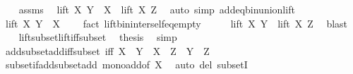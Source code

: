\begin{isabellebody}
\ \ \isamarkupfalse%
\ assms\ \isamarkupfalse%
\ {\isachardoublequoteopen}lift\ X\ Y\ {\isasymsubseteq}\ X\ {\isasymunion}\ lift\ X\ Z{\isachardoublequoteclose}\ \isamarkupfalse%
\ {\isacharparenleft}{\kern0pt}auto\ simp{\isacharcolon}{\kern0pt}\ add{\isacharunderscore}{\kern0pt}eq{\isacharunderscore}{\kern0pt}bin{\isacharunderscore}{\kern0pt}union{\isacharunderscore}{\kern0pt}lift{\isacharparenright}{\kern0pt}\isanewline
\ \ \isamarkupfalse%
\ \isamarkupfalse%
\ {\isachardoublequoteopen}lift\ X\ Y\ {\isasyminter}\ X\ {\isacharequal}{\kern0pt}\ {\isacharbraceleft}{\kern0pt}{\isacharbraceright}{\kern0pt}{\isachardoublequoteclose}\ \isamarkupfalse%
\ {\isacharparenleft}{\kern0pt}fact\ lift{\isacharunderscore}{\kern0pt}bin{\isacharunderscore}{\kern0pt}inter{\isacharunderscore}{\kern0pt}self{\isacharunderscore}{\kern0pt}eq{\isacharunderscore}{\kern0pt}empty{\isacharparenright}{\kern0pt}\isanewline
\ \ \isamarkupfalse%
\ \isamarkupfalse%
\ {\isachardoublequoteopen}lift\ X\ Y\ {\isasymsubseteq}\ lift\ X\ Z{\isachardoublequoteclose}\ \isamarkupfalse%
\ blast\isanewline
\ \ \isamarkupfalse%
\ lift{\isacharunderscore}{\kern0pt}subset{\isacharunderscore}{\kern0pt}lift{\isacharunderscore}{\kern0pt}iff{\isacharunderscore}{\kern0pt}subset\ \isamarkupfalse%
\ {\isacharquery}{\kern0pt}thesis\ \isamarkupfalse%
\ simp\isanewline
{}\isamarkupfalse%
%
\endisatagproof
{\isafoldproof}%
%
\isadelimproof
\isanewline
%
\endisadelimproof
\isanewline
{}\isamarkupfalse%
\ add{\isacharunderscore}{\kern0pt}subset{\isacharunderscore}{\kern0pt}add{\isacharunderscore}{\kern0pt}iff{\isacharunderscore}{\kern0pt}subset\ {\isacharbrackleft}{\kern0pt}iff{\isacharbrackright}{\kern0pt}{\isacharcolon}{\kern0pt}\ {\isachardoublequoteopen}X\ {\isacharplus}{\kern0pt}\ Y\ {\isasymsubseteq}\ X\ {\isacharplus}{\kern0pt}\ Z\ {\isasymlongleftrightarrow}\ Y\ {\isasymsubseteq}\ Z{\isachardoublequoteclose}\isanewline
%
\isadelimproof
\ \ %
\endisadelimproof
%
\isatagproof
{}\isamarkupfalse%
\ subset{\isacharunderscore}{\kern0pt}if{\isacharunderscore}{\kern0pt}add{\isacharunderscore}{\kern0pt}subset{\isacharunderscore}{\kern0pt}add\ mono{\isacharunderscore}{\kern0pt}add{\isacharbrackleft}{\kern0pt}of\ X{\isacharbrackright}{\kern0pt}\ \isamarkupfalse%
\ {\isacharparenleft}{\kern0pt}auto\ del{\isacharcolon}{\kern0pt}\ subsetI{\isacharparenright}{\kern0pt}%

\end{isabellebody}
